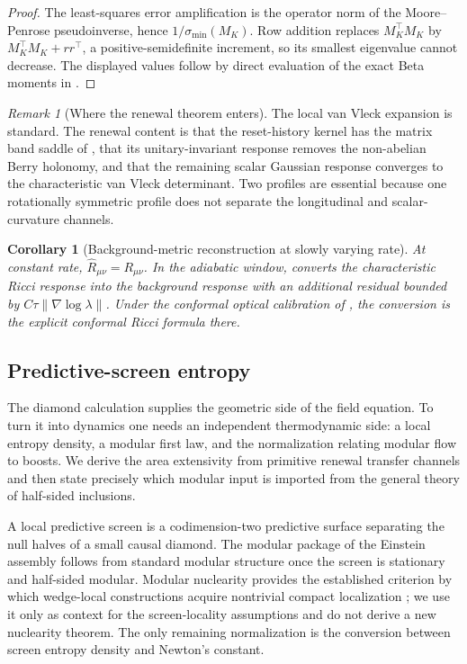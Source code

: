 \documentclass[11pt]{article}
\newtheorem{corollary}[theorem]{Corollary}
\theoremstyle{definition}
\theoremstyle{remark}
\newtheorem{remark}[theorem]{Remark}
\begin{document}
\begin{proof}
The least-squares error amplification is the operator norm of the Moore--Penrose
pseudoinverse, hence $1/\sigma_{\min}(M_K)$.  Row addition replaces
$M_K^\top M_K$ by $M_K^\top M_K+rr^\top$, a positive-semidefinite increment, so
its smallest eigenvalue cannot decrease.  The displayed values follow by direct
evaluation of the exact Beta moments in .
\end{proof}

\begin{remark}[Where the renewal theorem enters]
\label{rem:where-renewal-enters-ricci}
The local van Vleck expansion is standard.  The renewal content is that the
reset-history kernel has the matrix band saddle of , that
its unitary-invariant response removes the non-abelian Berry holonomy, and that
the remaining scalar Gaussian response converges to the characteristic van Vleck
determinant.  Two profiles are essential because one rotationally symmetric
profile does not separate the longitudinal and scalar-curvature channels.
\end{remark}

\begin{corollary}[Background-metric reconstruction at slowly varying rate]
\label{cor:background-ricci}
At constant rate, $\widehat R_{\mu\nu}=R_{\mu\nu}$.  In the adiabatic window,
 converts the characteristic Ricci response into the
background response with an additional residual bounded by
$C\tau\|\nabla\log\lambda\|$.  Under the conformal optical calibration of
, the conversion is the explicit conformal Ricci formula
there.
\end{corollary}

\subsection{Predictive-screen entropy}

The diamond calculation supplies the geometric side of the field equation.  To
turn it into dynamics one needs an independent thermodynamic side: a local
entropy density, a modular first law, and the normalization relating modular
flow to boosts.  We derive the area extensivity from primitive renewal transfer
channels and then state precisely which modular input is imported from the
general theory of half-sided inclusions.

A local predictive screen is a codimension-two predictive surface separating the
null halves of a small causal diamond.  The modular package of the Einstein
assembly follows from standard modular structure once the screen is stationary and
half-sided modular.  Modular nuclearity provides the established criterion by
which wedge-local constructions acquire nontrivial compact localization
\cite{BuchholzLechner}; we use it only as context for the screen-locality
assumptions and do not derive a new nuclearity theorem.  The only remaining
normalization is the conversion between
screen entropy density and Newton's constant.
\end{document}
